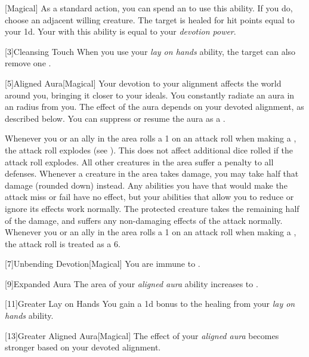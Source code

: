        [Magical] As a standard action, you can spend an  to use this ability.
        If you do, choose an adjacent willing creature.
        The target is healed for hit points equal to your  \plus1d.
        Your  with this ability is equal to your \textit{devotion power}.

        [3]{Cleansing Touch} When you use your \textit{lay on hands} ability, the target can also remove one .

        [5]{Aligned Aura}[Magical]
        Your devotion to your alignment affects the world around you, bringing it closer to your ideals.
        You constantly radiate an aura in an \areamed radius  from you.
        The effect of the aura depends on your devoted alignment, as described below.
        You can suppress or resume the aura as a .

         Whenever you or an ally in the area rolls a 1 on an attack roll when making a , the attack roll explodes (see ).
        This does not affect additional dice rolled if the attack roll explodes.
         All other creatures in the area suffer a  penalty to all defenses.
         Whenever a creature in the area takes damage, you may take half that damage (rounded down) instead.
        Any abilities you have that would make the attack miss or fail have no effect, but your abilities that allow you to reduce or ignore its effects work normally.
        The protected creature takes the remaining half of the damage, and suffers any non-damaging effects of the attack normally.
         Whenever you or an ally in the area rolls a 1 on an attack roll when making a , the attack roll is treated as a 6.

        [7]{Unbending Devotion}[Magical]
        You are immune to  .

        [9]{Expanded Aura}
        The area of your \textit{aligned aura} ability increases to \arealarge.

        [11]{Greater Lay on Hands} 
        You gain a \plus1d bonus to the healing from your \textit{lay on hands} ability.

        [13]{Greater Aligned Aura}[Magical]
        The effect of your \textit{aligned aura} becomes stronger based on your devoted alignment.

